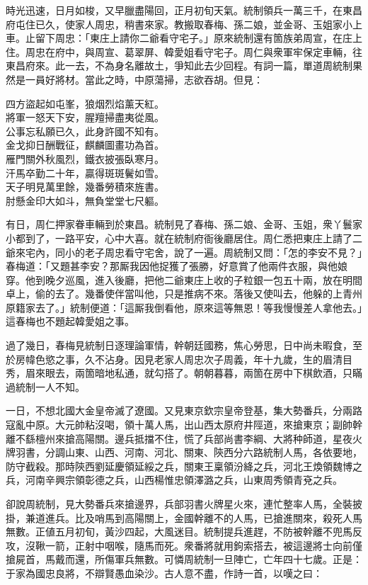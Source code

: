 時光迅速，日月如梭，又早臘盡陽回，正月初旬天氣。統制領兵一萬三千，在東昌府屯住已久，使家人周忠，稍書來家。教搬取春梅、孫二娘，並金哥、玉姐家小上車。止留下周忠：「東庄上請你二爺看守宅子。」原來統制還有箇族弟周宣，在庄上住。周忠在府中，與周宣、葛翠屏、韓愛姐看守宅子。周仁與衆軍牢保定車輛，往東昌府來。此一去，不為身名離故土，爭知此去少回程。有詞一篇，單道周統制果然是一員好將材。當此之時，中原蕩掃，志欲吞胡。但見：

\begin{myquote}
四方盜起如屯峯，狼烟烈焰薰天紅。\\將軍一怒天下安，腥羶掃盡夷從風。\\公事忘私願已久，此身許國不知有。{}\\金戈抑日酬戰征，麒麟圖畫功為首。\\雁門關外秋風烈，鐵衣披張臥寒月。\\汗馬卒勤二十年，贏得斑斑鬢如雪。\\天子明見萬里餘，幾番勞積來旌書。\\肘懸金印大如斗，無負堂堂七尺軀。
\end{myquote}

有日，周仁押家眷車輛到於東昌。統制見了春梅、孫二娘、金哥、玉姐，衆丫鬟家小都到了，一路平安，心中大喜。就在統制府衙後廳居住。周仁悉把東庄上請了二爺來宅內，同小的老子周忠看守宅舍，說了一遍。周統制又問：「怎的李安不見？」春梅道：「又題甚李安？那厮我因他捉獲了張勝，好意賞了他兩件衣服，與他娘穿。他到晚夕巡風，進入後廳，把他二爺東庄上收的子粒銀一包五十兩，放在明間卓上，偷的去了。幾番使伴當叫他，只是推病不來。落後又使叫去，他躲的上青州原籍家去了。」統制便道：「這厮我倒看他，原來這等無恩！等我慢慢差人拿他去。」這春梅也不題起韓愛姐之事。

過了幾日，春梅見統制日逐理論軍情，幹朝廷國務，焦心勞思，日中尚未暇食，至於房幃色慾之事，久不沾身。因見老家人周忠次子周義，年十九歲，生的眉清目秀，眉來眼去，兩箇暗地私通，就勾搭了。{}朝朝暮暮，兩箇在房中下棋飲酒，只瞞過統制一人不知。

一日，不想北國大金皇帝滅了遼國。又見東京欽宗皇帝登基，集大勢番兵，分兩路寇亂中原。大元帥粘沒喝，領十萬人馬，出山西太原府井陘道，來搶東京；副帥幹離不繇檀州來搶高陽關。邊兵抵擋不住，慌了兵部尚書李綱、大將种師道，星夜火牌羽書，分調山東、山西、河南、河北、關東、陝西分六路統制人馬，各依要地，防守截殺。那時陝西劉延慶領延綏之兵，關東王稟領汾絳之兵，河北王煥領魏博之兵，河南辛興宗領彰德之兵，山西楊惟忠領澤潞之兵，山東周秀領青兗之兵。

卻說周統制，見大勢番兵來搶邊界，兵部羽書火牌星火來，連忙整率人馬，全裝披掛，兼道進兵。比及哨馬到高陽關上，金國幹離不的人馬，已搶進關來，殺死人馬無數。正値五月初旬，黃沙四起，大風迷目。統制提兵進趕，不防被幹離不兜馬反攻，沒鞦一箭，正射中咽喉，隨馬而死。衆番將就用鉤索搭去，被這邊將士向前僅搶屍首，馬戴而還，所傷軍兵無數。可憐周統制一旦陣亡，亡年四十七歲。正是：于家為國忠良將，不辯賢愚血染沙。古人意不盡，作詩一首，以嘆之曰：

